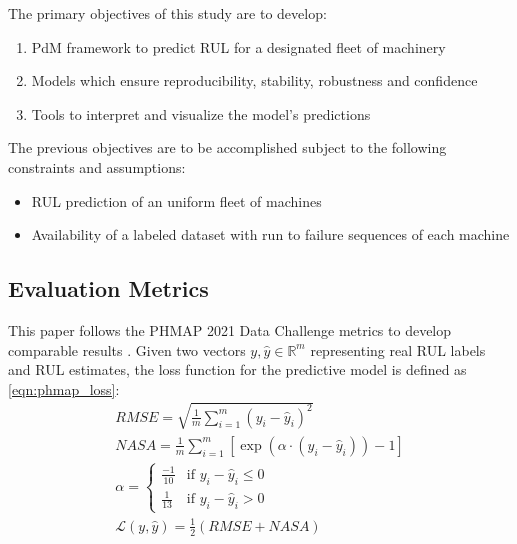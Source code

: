 \documentclass{IEEEtran}
\begin{document}
        The primary objectives of this study are to develop:
        \begin{enumerate}
            \item PdM framework to predict RUL for a designated fleet of machinery
            \item Models which ensure reproducibility, stability, robustness and confidence
            \item Tools to interpret and visualize the model's predictions
        \end{enumerate}

        The previous objectives are to be accomplished subject to the following constraints and assumptions:
        \begin{itemize}
            \item RUL prediction of an uniform fleet of machines
            \item Availability of a labeled dataset with run to failure sequences of each machine
        \end{itemize}

        \subsection{Evaluation Metrics}

            This paper follows the PHMAP 2021 Data Challenge metrics to develop comparable results \cite{ncmapss-dataset}. Given two vectors $y, \hat{y} \in \mathbb{R}^{m}$ representing real RUL labels and RUL estimates, the loss function for the predictive model is defined as \eqref{eqn:phmap_loss}:
            \begin{equation} \label{eqn:phmap_loss}
                \begin{gathered}
                    RMSE = \sqrt{\frac{1}{m}\sum_{i=1}^{m} (y_i - \hat{y}_i)^{2}} \\
                    NASA = \frac{1}{m}\sum_{i=1}^{m} \left[\exp (\alpha \cdot (y_i - \hat{y}_i)) - 1\right]\\
                    \alpha = \begin{cases}
                        \frac{-1}{10} & \text{if } y_i - \hat{y}_i \leq 0 \\
                        \frac{1}{13} & \text{if } y_i - \hat{y}_i > 0
                    \end{cases}  \\
                    \mathcal{L}(y, \hat{y}) = \frac{1}{2} \left(RMSE + NASA\right) \\
                \end{gathered}
            \end{equation}
\end{document}
